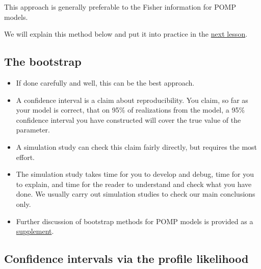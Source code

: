 \documentclass[
  letterpaper,
  DIV=11,
  numbers=noendperiod]{scrartcl}
\providecommand{\tightlist}{%
  \setlength{\itemsep}{0pt}\setlength{\parskip}{0pt}}\usepackage{longtable,booktabs,array}
\begin{document}
This approach is generally preferable to the Fisher information for POMP
models.

We will explain this method below and put it into practice in the
\href{https://kingaa.github.io/sbied/mif/}{next lesson}.

\hypertarget{the-bootstrap}{%
\subsection{The bootstrap}\label{the-bootstrap}}

\begin{itemize}
\tightlist
\item
  If done carefully and well, this can be the best approach.
\item
  A confidence interval is a claim about reproducibility. You claim, so
  far as your model is correct, that on 95\% of realizations from the
  model, a 95\% confidence interval you have constructed will cover the
  true value of the parameter.
\item
  A simulation study can check this claim fairly directly, but requires
  the most effort.
\item
  The simulation study takes time for you to develop and debug, time for
  you to explain, and time for the reader to understand and check what
  you have done. We usually carry out simulation studies to check our
  main conclusions only.
\item
  Further discussion of bootstrap methods for POMP models is provided as
  a \href{bootstrap.html}{supplement}.
\end{itemize}

\hypertarget{confidence-intervals-via-the-profile-likelihood}{%
\subsection{Confidence intervals via the profile
likelihood}\label{confidence-intervals-via-the-profile-likelihood}}
\end{document}
